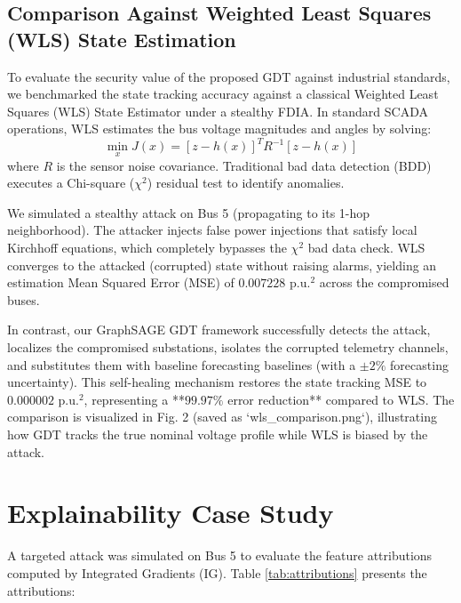 \documentclass[conference]{IEEEtran}
\begin{document}
\subsection{Comparison Against Weighted Least Squares (WLS) State Estimation}
To evaluate the security value of the proposed GDT against industrial standards, we benchmarked the state tracking accuracy against a classical Weighted Least Squares (WLS) State Estimator under a stealthy FDIA. In standard SCADA operations, WLS estimates the bus voltage magnitudes and angles by solving:
\begin{equation}
\min_{x} J(x) = [z - h(x)]^T R^{-1} [z - h(x)]
\end{equation}
where $R$ is the sensor noise covariance. Traditional bad data detection (BDD) executes a Chi-square ($\chi^2$) residual test to identify anomalies.

We simulated a stealthy attack on Bus 5 (propagating to its 1-hop neighborhood). The attacker injects false power injections that satisfy local Kirchhoff equations, which completely bypasses the $\chi^2$ bad data check. WLS converges to the attacked (corrupted) state without raising alarms, yielding an estimation Mean Squared Error (MSE) of $0.007228\text{ p.u.}^2$ across the compromised buses.

In contrast, our GraphSAGE GDT framework successfully detects the attack, localizes the compromised substations, isolates the corrupted telemetry channels, and substitutes them with baseline forecasting baselines (with a $\pm 2\%$ forecasting uncertainty). This self-healing mechanism restores the state tracking MSE to $0.000002\text{ p.u.}^2$, representing a **$99.97\%$ error reduction** compared to WLS. The comparison is visualized in Fig. 2 (saved as `wls_comparison.png`), illustrating how GDT tracks the true nominal voltage profile while WLS is biased by the attack.

\section{Explainability Case Study}
A targeted attack was simulated on Bus 5 to evaluate the feature attributions computed by Integrated Gradients (IG). Table \ref{tab:attributions} presents the attributions:
\end{document}
